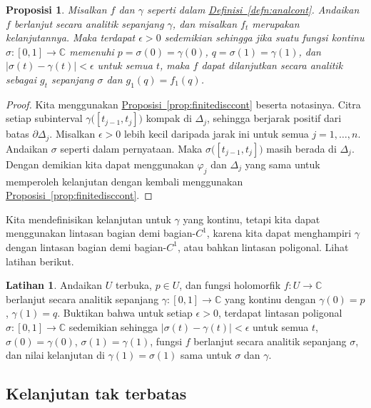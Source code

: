 \documentclass[12pt,openany]{book}
\newcommand{\sabs}[1]{\lvert {#1} \rvert}
\newcommand{\C}{{\mathbb{C}}}
\theoremstyle{plain}
\newtheorem{prop}[thm]{Proposisi}
\theoremstyle{remark}
\theoremstyle{definition}
\newenvironment{exbox}{%
    \def\FrameCommand{\vrule width 1pt \relax\hspace{10pt}}%
    \MakeFramed{\advance\hsize-\width\FrameRestore}%
}{%
    \endMakeFramed
}
\theoremstyle{exercise}
\newtheorem{exercise}{Latihan}[section]
\theoremstyle{example}
\newcommand{\propref}[1]{\hyperref[#1]{Proposisi~\ref*{#1}}}
\newcommand{\defnref}[1]{\hyperref[#1]{Definisi~\ref*{#1}}}
\begin{document}
\begin{prop} \label{prop:continuationclose}
Misalkan $f$ dan $\gamma$ seperti dalam \defnref{defn:analcont}.
Andaikan $f$ berlanjut secara analitik sepanjang $\gamma$, dan misalkan
$f_t$ merupakan kelanjutannya.
Maka terdapat $\epsilon > 0$ sedemikian sehingga jika
suatu fungsi kontinu
$\sigma \colon [0,1] \to \C$ memenuhi $p=\sigma(0)=\gamma(0)$,
$q=\sigma(1)=\gamma(1)$, dan
$\sabs{\sigma(t)-\gamma(t)} < \epsilon$ untuk semua $t$,
maka
$f$ dapat dilanjutkan secara analitik sebagai $g_t$ sepanjang $\sigma$ dan
$g_1(q)=f_1(q)$.
\end{prop}

\begin{proof}
Kita menggunakan \propref{prop:finitedisccont} beserta notasinya.  
Citra setiap subinterval $\gamma \bigl([t_{j-1},t_j]\bigr)$ kompak
di $\Delta_j$, sehingga berjarak positif dari batas $\partial
\Delta_j$.  Misalkan $\epsilon > 0$ lebih kecil daripada jarak ini untuk semua
$j=1,\ldots,n$.  Andaikan $\sigma$ seperti dalam pernyataan.
Maka $\sigma \bigl([t_{j-1},t_j]\bigr)$ masih berada di $\Delta_j$.  Dengan demikian kita dapat
menggunakan $\varphi_j$ dan $\Delta_j$ yang sama untuk memperoleh kelanjutan dengan kembali menggunakan
\propref{prop:finitedisccont}.
\end{proof}

Kita mendefinisikan kelanjutan untuk $\gamma$ yang kontinu, tetapi kita dapat menggunakan
lintasan bagian demi bagian-$C^1$, karena kita dapat menghampiri $\gamma$ dengan lintasan
bagian demi bagian-$C^1$, atau bahkan lintasan poligonal.  Lihat latihan berikut.

\begin{exbox}
\begin{exercise}
Andaikan $U$ terbuka, $p \in U$, dan fungsi holomorfik $f \colon U \to \C$
berlanjut secara analitik sepanjang
$\gamma \colon [0,1] \to \C$ yang kontinu dengan $\gamma(0) = p$,
$\gamma(1)=q$. Buktikan bahwa untuk
setiap $\epsilon > 0$, terdapat
lintasan poligonal $\sigma \colon [0,1] \to \C$ sedemikian 
sehingga $\sabs{\sigma(t)-\gamma(t)} < \epsilon$ untuk semua $t$,
$\sigma(0)=\gamma(0)$, $\sigma(1)=\gamma(1)$, fungsi
$f$ berlanjut secara analitik sepanjang $\sigma$,
dan nilai kelanjutan di $\gamma(1)=\sigma(1)$
sama untuk $\sigma$ dan $\gamma$.
\end{exercise}
\end{exbox}

\subsection{Kelanjutan tak terbatas}
\end{document}
